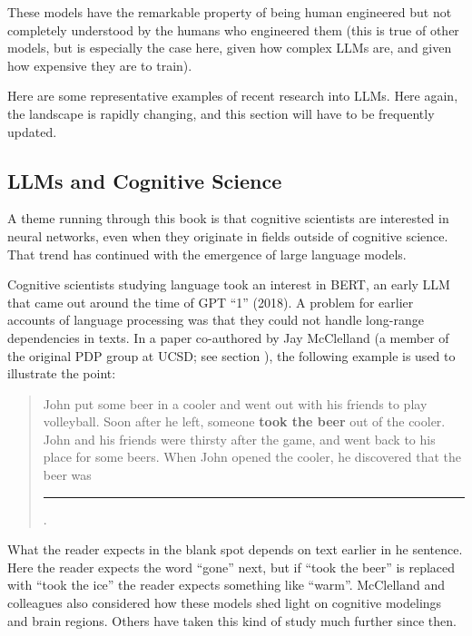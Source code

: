 These models have the remarkable property of being human engineered but not completely understood by the humans who engineered them (this is true of other models, but is especially the case here, given how complex LLMs are, and given how expensive they are to train). 

Here are some representative examples of recent research into LLMs. Here again, the landscape is rapidly changing, and this section will have to be frequently updated.

\subsection{LLMs and Cognitive Science}\label{llm_cogsci}

A theme running through this book is that cognitive scientists are interested in neural networks, even when they originate in fields outside of cognitive science. That trend has continued with the emergence of large language models.

Cognitive scientists studying language took an interest in BERT, an early LLM that came out around the time of GPT ``1'' (2018). A problem for earlier accounts of language processing was that they could not handle long-range dependencies in texts. In a paper co-authored by Jay McClelland  \cite{mcclelland2020placing} (a member of the original PDP group at UCSD; see section ), the following example is used to illustrate the point:
\begin{quote}
John put some beer in a cooler and went out with his friends to play volleyball. Soon after he left, someone \textbf{took the beer} out of the cooler. John and his friends were thirsty after the game, and went back to his place for some beers. When John opened the cooler, he discovered that the beer was \rule{1cm}{0.15mm}.
\end{quote}
What the reader expects in the blank spot  depends on text earlier in he sentence. Here the reader expects the word ``gone'' next, but if ``took the beer'' is replaced with ``took the ice'' the reader expects something like ``warm''. McClelland and colleagues also considered how these models shed light on cognitive modelings and brain regions. Others have taken this kind of study much further since then.

